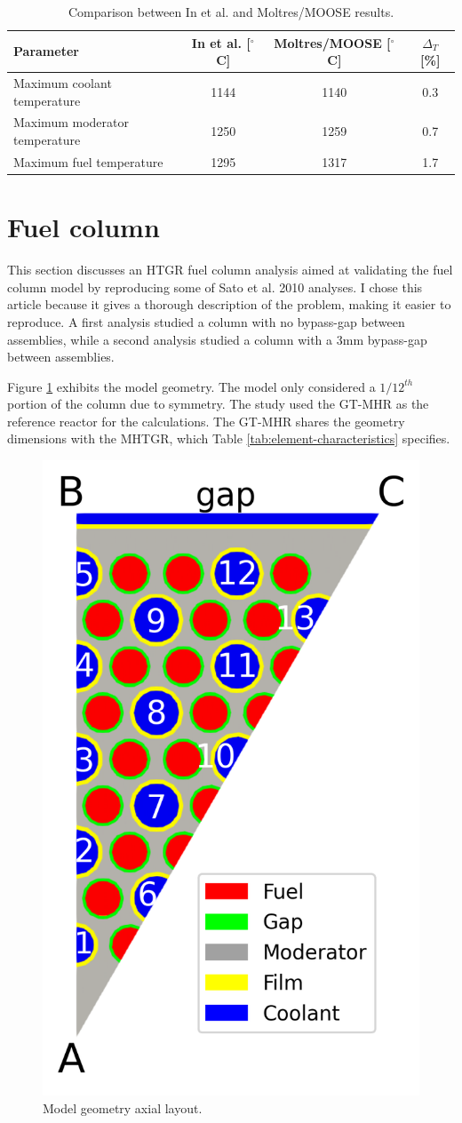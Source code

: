 \begin{table}[htbp!]
\centering
    \caption{Comparison between In et al. \cite{in_three-dimensional_2006} and Moltres/MOOSE results.}
    \label{tab:th-val-unit-results}
    \begin{tabular}{@{}l c c c}
    \toprule
  Parameter                      & In et al. [$^{\circ}$C] & Moltres/MOOSE [$^{\circ}$C] & $\Delta_T$ [\%]\\
    \midrule
  Maximum coolant temperature    & 1144      & 1140          & 0.3 \\
  Maximum moderator temperature  & 1250      & 1259          & 0.7 \\
  Maximum fuel temperature       & 1295      & 1317          & 1.7 \\
    \bottomrule
  \end{tabular}
\end{table}

\section{Fuel column}
\label{sec:fuelcol}

This section discusses an HTGR fuel column analysis aimed at validating the fuel column model by reproducing some of Sato et al. 2010 \cite{sato_computational_2010} analyses.
I chose this article because it gives a thorough description of the problem, making it easier to reproduce.
A first analysis studied a column with no bypass-gap between assemblies, while a second analysis studied a column with a 3mm bypass-gap between assemblies.

Figure \ref{fig:th-val-assem-model-a} exhibits the model geometry.
The model only considered a $1/12^{th}$ portion of the column due to symmetry.
The study used the GT-MHR as the reference reactor for the calculations.
The GT-MHR shares the geometry dimensions with the MHTGR, which Table \ref{tab:element-characteristics} specifies.

\begin{figure}[htbp!]
  \centering
  \includegraphics[width=0.25\linewidth]{figures-thermal/val-assem-mesh}
  \hfill
  \caption{Model geometry axial layout.}
  \label{fig:th-val-assem-model-a}
\end{figure}


